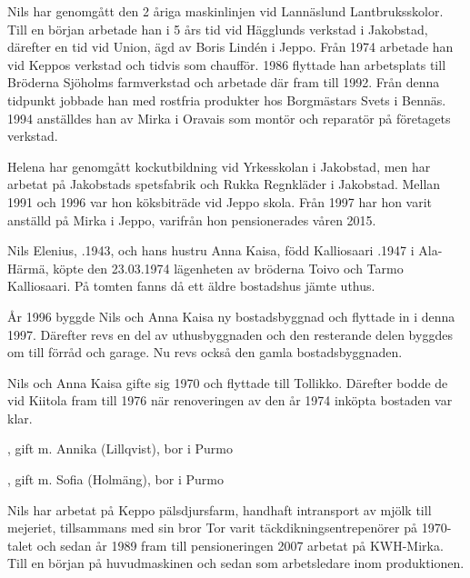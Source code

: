 Nils har genomgått den 2 åriga maskinlinjen vid Lannäslund Lantbruksskolor. Till en början arbetade han i 5 års tid vid Hägglunds verkstad i Jakobstad, därefter en tid vid Union, ägd av Boris Lindén i Jeppo. Från 1974 arbetade han vid Keppos verkstad och tidvis som chaufför. 1986 flyttade han arbetsplats till Bröderna Sjöholms farmverkstad och arbetade där fram till 1992. Från denna tidpunkt jobbade han med rostfria produkter hos Borgmästars Svets i Bennäs. 1994 anställdes han av Mirka i Oravais som montör och reparatör på företagets verkstad.

Helena har genomgått kockutbildning vid Yrkesskolan i Jakobstad, men har arbetat på Jakobstads spetsfabrik och Rukka Regnkläder i Jakobstad. Mellan 1991 och 1996 var hon köksbiträde vid Jeppo skola. Från 1997 har hon varit anställd på Mirka i Jeppo, varifrån hon pensionerades våren 2015.
\begin{jhchildren}
  \item {}
  \item {}
\end{jhchildren}



%



%
Nils Elenius, .1943, och hans hustru Anna Kaisa, född Kalliosaari .1947 i Ala-Härmä, köpte den 23.03.1974 lägenheten av bröderna Toivo och Tarmo Kalliosaari. På tomten fanns då ett äldre bostadshus jämte uthus.

År 1996 byggde Nils och Anna Kaisa ny bostadsbyggnad och flyttade in i denna 1997. Därefter revs en del av uthusbyggnaden och den resterande delen byggdes om till förråd och garage. Nu revs också den gamla bostadsbyggnaden.

Nils och Anna Kaisa gifte sig 1970 och flyttade till Tollikko. Därefter bodde de vid Kiitola fram till 1976 när renoveringen av den år 1974
inköpta bostaden var klar.
\begin{jhchildren}
  \item {}, gift m. Annika (Lillqvist), bor i Purmo
  \item {}, gift m. Sofia (Holmäng), bor i Purmo
\end{jhchildren}
Nils har arbetat på Keppo pälsdjursfarm, handhaft intransport av mjölk till mejeriet, tillsammans med sin bror Tor varit täckdikningsentrepenörer på 1970-talet och sedan år 1989 fram till pensioneringen 2007 arbetat på KWH-Mirka. Till en början på huvudmaskinen och sedan som arbetsledare inom produktionen.

